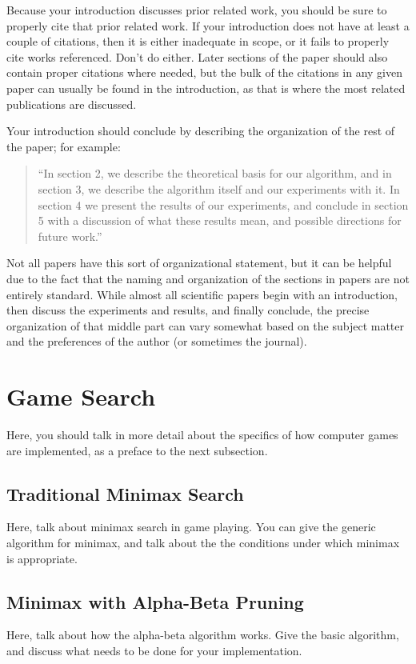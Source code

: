 \documentclass[12pt,letterpaper]{article}
\begin{document}
Because your introduction discusses prior related work, you should be sure to
properly cite that prior related work.  If your introduction does not have at
least a couple of citations, then it is either inadequate in scope, or it fails
to properly cite works referenced.  Don't do either.  Later sections of the
paper should also contain proper citations where needed, but the bulk of the
citations in any given paper can usually be found in the introduction, as that
is where the most related publications are discussed.

Your introduction should conclude by describing the organization of the rest of
the paper; for example:
\begin{quote}
``In section 2, we describe the theoretical basis for our algorithm, and in section
3, we describe the algorithm itself and our experiments with it.  In section 4
we present the results of our experiments, and conclude in section 5 with a
discussion of what these results mean, and possible directions for future
work.''
\end{quote}

Not all papers have this sort of organizational statement, but it can be helpful
due to the fact that the naming and organization of the sections in papers are
not entirely standard.  While almost all scientific papers begin with an
introduction, then discuss the experiments and results, and finally conclude,
the precise organization of that middle part can vary somewhat based on the
subject matter and the preferences of the author (or sometimes the journal).

\section{Game Search}
Here, you should talk in more detail about the specifics of how computer games
are implemented, as a preface to the next subsection.

\subsection{Traditional Minimax Search}
Here, talk about minimax search in game playing.  You can give the generic
algorithm for minimax, and talk about the the conditions under which minimax
is appropriate.

\subsection{Minimax with Alpha-Beta Pruning}
Here, talk about how the alpha-beta algorithm works.  Give the basic algorithm, and
discuss what needs to be done for your implementation.
\end{document}
